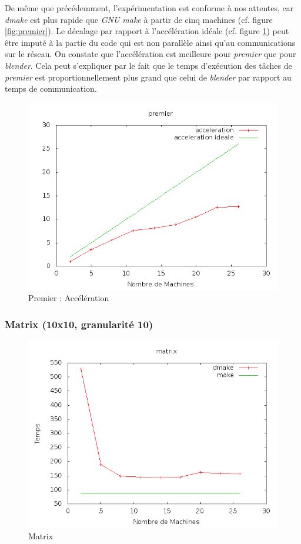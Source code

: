 \documentclass[a4paper,12pt,twoside]{article}
\begin{document}
De même que précédemment, l'expérimentation est conforme à nos attentes, 
car \emph{dmake} est plus rapide que \emph{GNU make} à  partir de cinq machines (cf. figure \ref{fig:premier}). Le décalage par rapport à l'accélération idéale (cf. figure \ref{fig:premierAcc}) peut
être imputé à la partie du code qui est non parallèle ainsi qu'au communications sur le réseau. 
On constate que l'accélération est meilleure pour \emph{premier} que pour \emph{blender}. Cela peut s'expliquer par le fait que le temps d'exécution des tâches de \emph{premier} est proportionnellement plus grand que celui de  \emph{blender} par rapport au temps de communication.

\begin{figure}[h]
  \centering
  \includegraphics[scale=0.5]{acceleration_premier.png}
  \caption{Premier : Accélération}
  \label{fig:premierAcc}
\end{figure}

\subsubsection{Matrix (10x10, granularité 10)}

\begin{figure}[h]
  \centering
  \includegraphics[scale=0.5]{graph_matrix.png}
  \caption{Matrix}
  \label{fig:matrix}
\end{figure}
\end{document}
